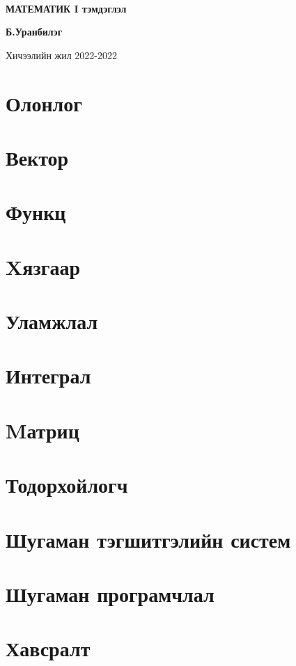\documentclass[11pt,twoside,openright]{report}
\begin{document}
\begin{titlepage}
	\centering
	
	\par\
	\vspace{0.5 cm}
	
	\vspace{5.5cm}
	{\huge\bfseries  МАТЕМАТИК I тэмдэглэл \par}
	\vspace{1cm}
	\raggedleft
	{\Large\bfseries  
	 Б.Уранбилэг\par}
	\vspace{1cm}
	\raggedleft
	\par
	\raggedleft 
	\vfill
\centering
	{\large Хичээлийн жил 2022-2022 \par}
	\tableofcontents
\end{titlepage}
\chapter{Олонлог}

\chapter{Вектор}

\chapter{Функц}

\chapter{Xязгаар}

\chapter{Уламжлал}

\chapter{Интеграл}

\chapter{Mатриц}

\chapter{Тодорхойлогч}

\chapter{Шугаман тэгшитгэлийн систем}

\chapter{Шугаман програмчлал}


\chapter{Хавсралт}



\end{document}
